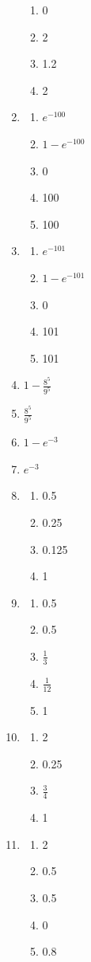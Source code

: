 \begin{enumerate}
\begin{enumerate}
				\item 0
				\item 2
				\item 1.2
				\item 2
			\end{enumerate}
	\item
			\begin{enumerate}
				\item $e^{-100}$
				\item $1 - e^{-100}$
				\item 0
				\item 100
				\item 100
			\end{enumerate}
	\item
			\begin{enumerate}
				\item $e^{-101}$
				\item $1 - e^{-101}$
				\item 0
				\item 101
				\item 101
			\end{enumerate}
	\item $1 - \frac{8^5}{9^5}$
	\item $\frac{8^5}{9^5}$
	\item $1 - e^{-3}$
	\item $e^{-3}$
	\item
			\begin{enumerate}
				\item 0.5
				\item 0.25
				\item 0.125
				\item 1
			\end{enumerate}
	\item
			\begin{enumerate}
				\item 0.5
				\item 0.5
				\item $\frac{1}{3}$
				\item $\frac{1}{12}$
				\item 1
			\end{enumerate}
	\item
			\begin{enumerate}
				\item 2
				\item 0.25
				\item $\frac{3}{4}$
				\item 1
			\end{enumerate}
	\item
			\begin{enumerate}
				\item 2
				\item 0.5
				\item 0.5
				\item 0
				\item 0.8
			\end{enumerate}
\end{enumerate}




